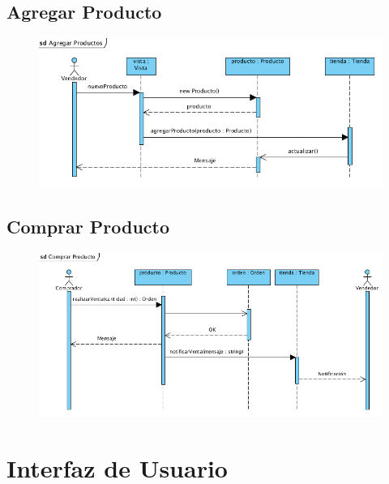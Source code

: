\subsection{Agregar Producto}
\begin{figure}[H]
  \centering
    \includegraphics[width=1\textwidth]{imagenes/disenio/secuencia-agregar-producto.png}
    \label{fig:diagrama-secuencia-agregar-producto}
\end{figure}

\subsection{Comprar Producto}
\begin{figure}[H]
  \centering
    \includegraphics[width=1\textwidth]{imagenes/disenio/secuencia-comprar-producto.png}
    \label{fig:diagrama-secuencia-comprar-producto}
\end{figure}

\section{Interfaz de Usuario}

